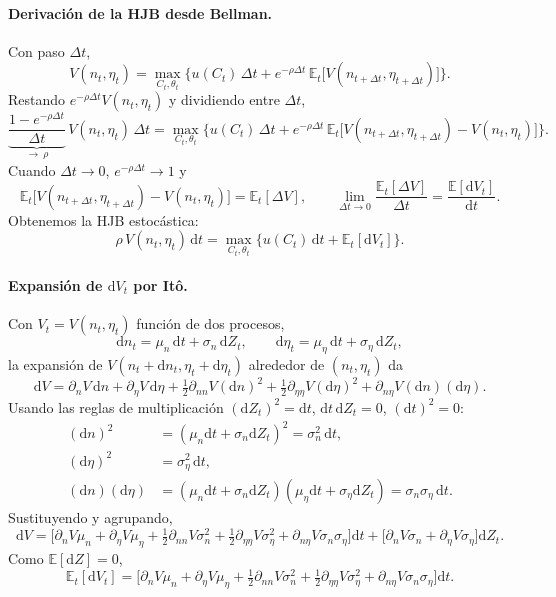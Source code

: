 \documentclass[11pt]{article}
\theoremstyle{definition}
\theoremstyle{remark}
\newcommand{\dd}{\mathrm{d}}
\newcommand{\E}{\mathbb{E}}
\newcommand{\pV}[1]{\partial_{#1} V}
\begin{document}
\paragraph{Derivación de la HJB desde Bellman.}
Con paso $\Delta t$,
\[
V(n_t,\eta_t)=\max_{C_t,\theta_t}\Big\{u(C_t)\,\Delta t + e^{-\rho\Delta t}\,\E_t\big[V(n_{t+\Delta t},\eta_{t+\Delta t})\big]\Big\}.
\]
Restando $e^{-\rho\Delta t}V(n_t,\eta_t)$ y dividiendo entre $\Delta t$,
\[
\underbrace{\frac{1-e^{-\rho\Delta t}}{\Delta t}}_{\to\ \rho}\,V(n_t,\eta_t)\,\Delta t
=\max_{C_t,\theta_t}\Big\{u(C_t)\,\Delta t + e^{-\rho\Delta t}\,\E_t\big[V(n_{t+\Delta t},\eta_{t+\Delta t})-V(n_t,\eta_t)\big]\Big\}.
\]
Cuando $\Delta t\to 0$, $e^{-\rho\Delta t}\to 1$ y
\[
\E_t\big[V(n_{t+\Delta t},\eta_{t+\Delta t})-V(n_t,\eta_t)\big]=\E_t[\Delta V],
\qquad
\lim_{\Delta t\to 0}\frac{\E_t[\Delta V]}{\Delta t}=\frac{\E[\dd V_t]}{\dd t}.
\]
Obtenemos la HJB estocástica:
\begin{equation}\label{eq:hjb-abstract}
\boxed{\ \rho\,V(n_t,\eta_t)\,\dd t=\max_{C_t,\theta_t}\big\{u(C_t)\,\dd t+\E_t[\dd V_t]\big\}.\ }
\end{equation}

\paragraph{Expansión de $\dd V_t$ por Itô.}
Con $V_t=V(n_t,\eta_t)$ función de dos procesos,
\[
\dd n_t=\mu_n\,\dd t+\sigma_n\,\dd Z_t,\qquad \dd\eta_t=\mu_\eta\,\dd t+\sigma_\eta\,\dd Z_t,
\]
la expansión de $V(n_t+\dd n_t,\eta_t+\dd\eta_t)$ alrededor de $(n_t,\eta_t)$ da
\[
\dd V=\pV{n}\,\dd n+\pV{\eta}\,\dd\eta
+\tfrac12\pV{nn}(\dd n)^2+\tfrac12\pV{\eta\eta}(\dd\eta)^2+\pV{n\eta}(\dd n)(\dd\eta).
\]
Usando las reglas de multiplicación $(\dd Z_t)^2=\dd t$, $\dd t\,\dd Z_t=0$, $(\dd t)^2=0$:
\begin{align*}
(\dd n)^2 &= (\mu_n\dd t+\sigma_n\dd Z_t)^2=\sigma_n^2\,\dd t,\\
(\dd\eta)^2 &= \sigma_\eta^2\,\dd t,\\
(\dd n)(\dd\eta) &= (\mu_n\dd t+\sigma_n\dd Z_t)(\mu_\eta\dd t+\sigma_\eta\dd Z_t)=\sigma_n\sigma_\eta\,\dd t.
\end{align*}
Sustituyendo y agrupando,
\[
\dd V=\Big[\pV{n}\mu_n+\pV{\eta}\mu_\eta+\tfrac12\pV{nn}\sigma_n^2+\tfrac12\pV{\eta\eta}\sigma_\eta^2+\pV{n\eta}\sigma_n\sigma_\eta\Big]\dd t
+\big[\pV{n}\sigma_n+\pV{\eta}\sigma_\eta\big]\dd Z_t.
\]
Como $\E[\dd Z]=0$,
\begin{equation}\label{eq:EdV}
\E_t[\dd V_t]=\Big[\pV{n}\mu_n+\pV{\eta}\mu_\eta+\tfrac12\pV{nn}\sigma_n^2+\tfrac12\pV{\eta\eta}\sigma_\eta^2+\pV{n\eta}\sigma_n\sigma_\eta\Big]\dd t.
\end{equation}
\end{document}
